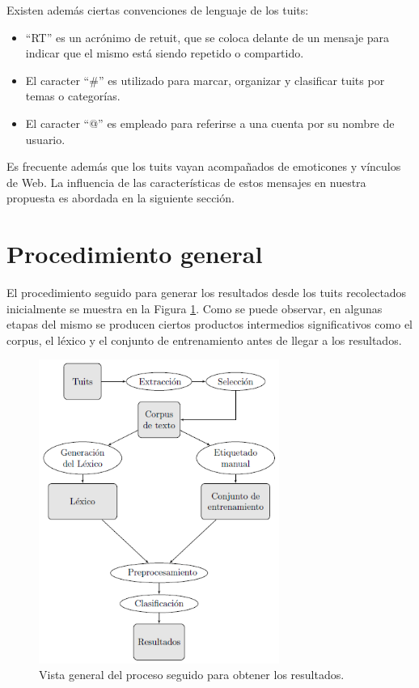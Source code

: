Existen adem\'as ciertas convenciones de lenguaje de los tuits:
\begin{itemize}
\item ``RT'' es un acr\'onimo de retuit, que se coloca delante de un mensaje para indicar que el mismo est\'a siendo repetido o compartido.
\item El caracter ``\#'' es utilizado para marcar, organizar y clasificar tuits por temas o categor\'ias.
\item El caracter ``@'' es empleado para referirse a una cuenta por su nombre de usuario.
\end{itemize}

Es frecuente adem\'as que los tuits vayan acompa\~nados de emoticones y v\'inculos de Web. La influencia de las caracter\'isticas de estos mensajes en nuestra propuesta es abordada en la siguiente secci\'on.

\section{Procedimiento general}
El procedimiento seguido para generar los resultados desde los tuits recolectados inicialmente se muestra en la Figura \ref{overview}. Como se puede observar, en algunas etapas del mismo se producen ciertos productos intermedios significativos como el corpus, el l\'exico y el conjunto de entrenamiento antes de llegar a los resultados.
\newline

\begin{figure}[h]
\centering
\includegraphics[width=0.7\textwidth]{overview.png}
\caption{Vista general del proceso seguido para obtener los resultados.}
\label{overview}
\end{figure}

